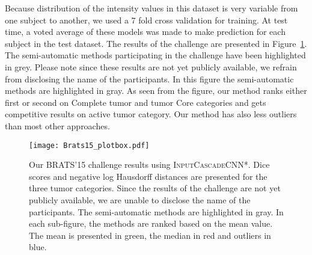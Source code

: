 \documentclass[final,5p,times,twocolumn]{elsarticle}
\begin{document}
{Because distribution of the intensity values in this dataset is very variable from one subject to another, we used a 7 fold cross validation for training. At test time, a voted average of these models was made to make prediction for each subject in the test dataset. The results of the challenge are presented in Figure~\ref{fig:brats15_results}. The semi-automatic methods participating in the challenge have been highlighted in grey. Please note since these results are not yet publicly available, we refrain from disclosing the name of the participants. In this figure the semi-automatic methods are highlighted in gray. As seen from the figure, our method ranks either first or second on Complete tumor and tumor Core categories and gets competitive results on active tumor category.  Our method has also less outliers than most other approaches.

\begin{figure}[t]
\centering

\texttt{[image: Brats15\_plotbox.pdf]}

\caption{Our BRATS'15 challenge results using \textsc{InputCascadeCNN*}. Dice scores and negative log Hausdorff distances are presented for the three tumor categories. Since the results of the challenge are not yet publicly available, we are unable to disclose the name of the participants. The semi-automatic methods are highlighted in gray. In each sub-figure, the methods are ranked based on the mean value. The mean is presented in green, the median in red and outliers in blue.}
\label{fig:brats15_results}
\end{figure} 












\begin{table*}[tp]

\caption{Comparison of our implemented architectures with the state-of-the-art methods on the BRATS-2013 test set.}

\begin{center}

\end{center}
\end{table*}}
\end{document}
